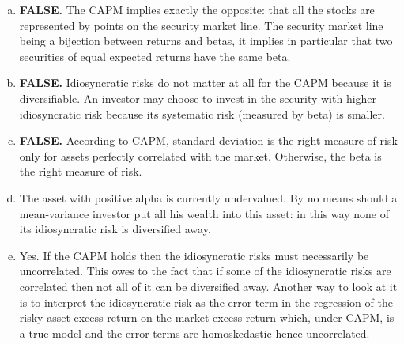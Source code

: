 \documentclass[10pt]{article}
\newenvironment{exercise}[2][Exercise]{\begin{trivlist}
  \item[\hskip \labelsep {\bfseries #1}\hskip \labelsep {\bfseries #2.}]}{\end{trivlist}}
\begin{document}
\begin{exercise}{3}
  \begin{enumerate}[(a)]
    \item
      \textbf{FALSE.} The CAPM implies exactly the opposite: that all the stocks
      are represented by points on the security market line. The security market
      line being a bijection between returns and betas, it implies in particular
      that two securities of equal expected returns have the same beta.
    \item
      \textbf{FALSE.} Idiosyncratic risks do not matter at all for the CAPM
      because it is diversifiable. An investor may choose to invest in the
      security with higher idiosyncratic risk because its systematic risk
      (measured by beta) is smaller.

    \item
      \textbf{FALSE.} According to CAPM, standard deviation is the right measure
      of risk only for assets perfectly correlated with the market. Otherwise,
      the beta is the right measure of risk.
    \item
      The asset with positive alpha is currently undervalued. By no means should
      a mean-variance investor put all his wealth into this asset: in this way
      none of its idiosyncratic risk is diversified away.
      \item
        Yes. If the CAPM holds then the idiosyncratic risks must necessarily be
        uncorrelated. This owes to the fact that if some of the idiosyncratic
        risks are correlated then not all of it can be diversified away. Another
        way to look at it is to interpret the idiosyncratic risk as the error term in the
        regression of the risky asset excess return on the market excess return which,
        under CAPM, is a true model and the error terms are homoskedastic hence uncorrelated.
  \end{enumerate}
\end{exercise}

\newpage
\end{document}
